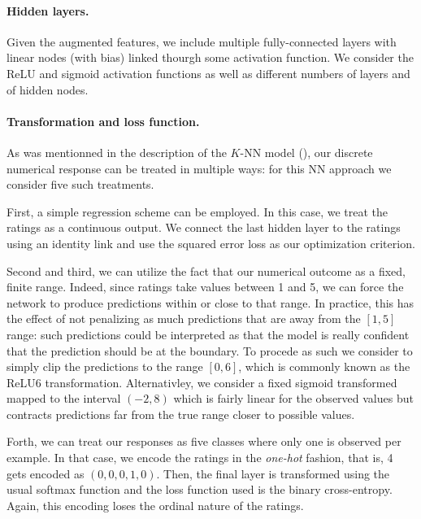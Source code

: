 \documentclass[bj, preprint]{imsart}
\begin{document}
\paragraph{Hidden layers.}\label{par:method.models.nn.hidden}

Given the augmented features, we include multiple fully-connected layers with linear nodes (with bias) linked thourgh some activation function. We consider the ReLU and sigmoid activation functions as well as different numbers of layers and of hidden nodes.

\paragraph{Transformation and loss function.}\label{par:method.models.nn.transform}

As was mentionned in the description of the $K$-NN model (), our discrete numerical response can be treated in multiple ways: for this NN approach we consider five such treatments.

First, a simple regression scheme can be employed. In this case, we treat the ratings as a continuous output. We connect the last hidden layer to the ratings using an identity link and use the squared error loss as our optimization criterion.

Second and third, we can utilize the fact that our numerical outcome as a fixed, finite range. Indeed, since ratings take values between 1 and 5, we can force the network to produce predictions within or close to that range. In practice, this has the effect of not penalizing as much predictions that are away from the $[1,5]$ range: such predictions could be interpreted as that the model is really confident that the prediction should be at the boundary. To procede as such we consider to simply clip the predictions to the range $[0,6]$, which is commonly known as the ReLU6 transformation. Alternativley, we consider a fixed sigmoid transformed mapped to the interval $(-2,8)$ which is fairly linear for the observed values but contracts predictions far from the true range closer to possible values.

Forth, we can treat our responses as five classes where only one is observed per example. In that case, we encode the ratings in the \textit{one-hot} fashion, that is, 4 gets encoded as $(0,0,0,1,0)$. Then, the final layer is transformed using the usual softmax function and the loss function used is the binary cross-entropy. Again, this encoding loses the ordinal nature of the ratings.
\end{document}
